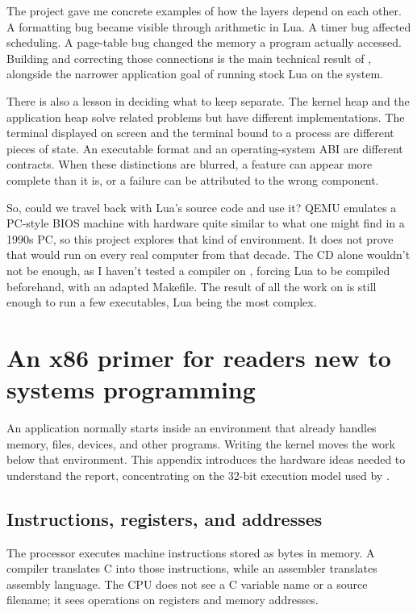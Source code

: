 \documentclass[11pt,a4paper]{scrartcl}
\newcommand{\code}[1]{\texttt{\detokenize{#1}}}
\begin{document}
The project gave me concrete examples of how the layers depend on each
other. A formatting bug became visible through arithmetic in Lua. A timer
bug affected scheduling. A page-table bug changed the memory a program
actually accessed. Building and correcting those connections is the main
technical result of \code{mboot}, alongside the narrower application goal
of running stock Lua on the system.


There is also a lesson in deciding what to keep separate. The kernel heap
and the application heap solve related problems but have different
implementations. The terminal displayed on screen and the terminal bound
to a process are different pieces of state. An executable format and an
operating-system ABI are different contracts. When these distinctions
are blurred, a feature can appear more complete than it is, or a failure
can be attributed to the wrong component.

So, could we travel back with Lua's source code and use it? QEMU emulates a
PC-style BIOS machine with hardware quite similar to what one might find
in a 1990s PC, so this project explores that kind of environment. It does
not prove that \code{mboot} would run on every real computer from that
decade. The CD alone wouldn't not be enough, as I haven't tested a compiler
on \code{mboot}, forcing Lua to be compiled beforehand, with an adapted Makefile.
The result of all the work on \code{mboot} is still enough to run a few
executables, Lua being the most complex.
\clearpage
\appendix
\section{An x86 primer for readers new to systems programming}
\label{app:primer}

An application normally starts inside an environment that already handles
memory, files, devices, and other programs. Writing the kernel moves the
work below that environment. This appendix introduces the hardware ideas
needed to understand the report, concentrating on the 32-bit execution
model used by \code{mboot}.

\subsection{Instructions, registers, and addresses}

The processor executes machine instructions stored as bytes in memory.
A compiler translates C into those instructions, while an assembler
translates assembly language. The CPU does not see a C variable name or
a source filename; it sees operations on registers and memory addresses.
\end{document}
